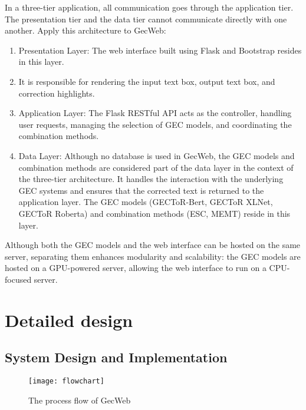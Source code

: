 In a three-tier application, all communication goes through the application tier.
The presentation tier and the data tier cannot communicate directly with one another.
Apply this architecture to GecWeb:

\begin{enumerate}
  \item Presentation Layer: The web interface built using Flask and Bootstrap resides in this layer.
  \item It is responsible for rendering the input text box, output text box, and correction highlights.
  \item Application Layer: The Flask RESTful API acts as the controller, handling user requests, managing the selection of GEC models, and coordinating the combination methods.
  \item Data Layer: Although no database is used in GecWeb, the GEC models and combination methods are considered part of the data layer in the context of the three-tier architecture.
        It handles the interaction with the underlying GEC systems and ensures that the corrected text is returned to the application layer.
        The GEC models (GECToR-Bert, GECToR XLNet, GECToR Roberta) and combination methods (ESC, MEMT) reside in this layer.
\end{enumerate}

Although both the GEC models and the web interface can be hosted on the same server, separating them enhances modularity and scalability: the GEC models are hosted on a GPU-powered server, allowing the web interface to run on a CPU-focused server.

\section{Detailed design}

\subsection{System Design and Implementation}

\begin{figure}[htbp]
  \begin{center}
    \texttt{[image: flowchart]}
  \end{center}
  \caption{The process flow of GecWeb}\label{fig:flowchart}
\end{figure}

